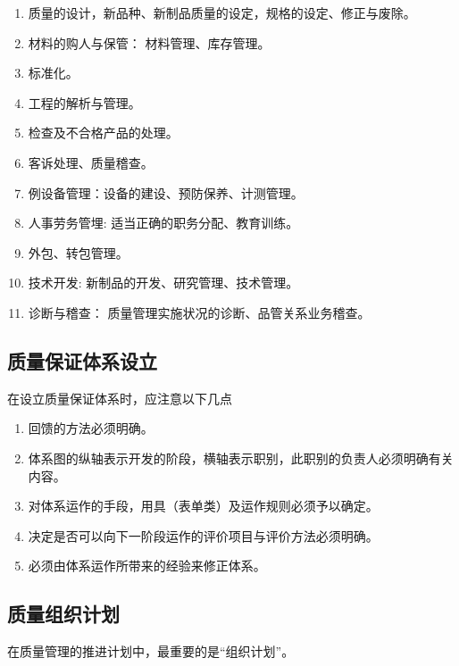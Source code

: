     \begin{enumerate}
        \item 质量的设计，新品种、新制品质量的设定，规格的设定、修正与废除。
        \item 材料的购人与保管： 材料管理、库存管理。
        \item 标准化。
        \item 工程的解析与管理。
        \item 检查及不合格产品的处理。
        \item 客诉处理、质量稽查。
        \item 例设备管理：设备的建设、预防保养、计测管理。
        \item 人事劳务管埋: 适当正确的职务分配、教育训练。
        \item  外包、转包管理。
        \item 技术开发: 新制品的开发、研究管理、技术管理。
        \item 诊断与稽查： 质量管理实施状况的诊断、品管关系业务稽查。
    \end{enumerate}

\subsection {质量保证体系设立}

    在设立质量保证体系时，应注意以下几点

    \begin{enumerate}
        \item 回馈的方法必须明确。
        \item 体系图的纵轴表示开发的阶段，横轴表示职别，此职别的负责人必须明确有关内容。
        \item 对体系运作的手段，用具（表单类）及运作规则必须予以确定。
        \item 决定是否可以向下一阶段运作的评价项目与评价方法必须明确。
        \item 必须由体系运作所带来的经验来修正体系。
    \end{enumerate}

\subsection {质量组织计划}

    在质量管理的推进计划中，最重要的是“组织计划”。

